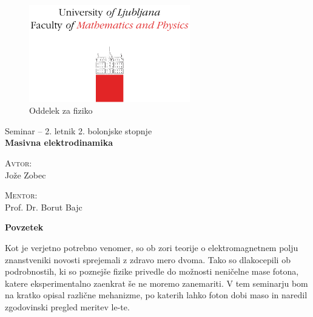 \documentclass[a4paper, twocolumn, titlepage]{article}
\renewenvironment{abstract}[1][1.0]
{
	\begin{center}
		{\bf Povzetek}\\[12pt]
		\begin{minipage}{#1\textwidth}
}
{
		\end{minipage}
	\end{center}
}
\begin{document}
\begin{titlepage}
	\begin{figure}[H]
		\centering
		\includegraphics[width = 7cm, keepaspectratio=1]{pics/logo.pdf}\\[12pt]
		{\sc Oddelek za fiziko}\\[4cm]
	\end{figure}
	\begin{center}
		\large{Seminar -- 2. letnik 2. bolonjske stopnje}\\[0.5cm]
		\LARGE\textbf{Masivna elektrodinamika}\\[1.0cm]

		\vspace{0.0cm}

		\begin{minipage}{0.4\textwidth}\small
			\begin{flushleft}
				\textsc{Avtor:}\\[0.2cm]
				Jože Zobec
			\end{flushleft}
		\end{minipage}
		\begin{minipage}{0.4\textwidth}\small
			\begin{flushright}
				\textsc{Mentor:}\\[0.2cm]
				Prof. Dr. Borut Bajc
			\end{flushright}
		\end{minipage}
	\end{center}

	\vspace{4.5cm}

	\begin{abstract}
		Kot je verjetno potrebno venomer, so ob zori teorije o elektromagnetnem polju znanstveniki novosti
		sprejemali z zdravo mero dvoma. Tako so dlakocepili ob podrobnostih, ki so poznejše fizike privedle
		do možnosti neničelne mase fotona, katere eksperimentalno zaenkrat še ne moremo zanemariti. V tem
		seminarju bom na kratko opisal različne mehanizme, po katerih lahko foton dobi maso in naredil
		zgodovinski pregled meritev le-te.
	\end{abstract}
	
	\vfill

\end{titlepage}
\end{document}
